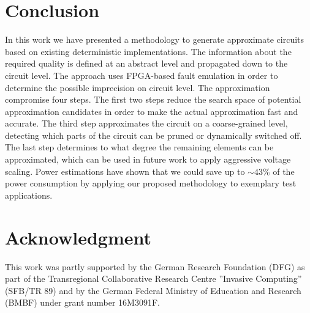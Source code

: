 \documentclass[10pt,twocolumn]{IEEEtran} %
\begin{document}
\section{\bf{Conclusion}}
\label{sec:conclusion}
In this work we have presented a methodology to generate approximate circuits based on existing deterministic implementations. The information about the required quality is defined at an abstract level and propagated down to the circuit level. The approach uses FPGA-based fault emulation in order to determine the possible imprecision on circuit level. The approximation compromise four steps. The first two steps reduce the search space of potential approximation candidates in order to make the actual approximation fast and accurate. The third step approximates the circuit on a coarse-grained level, detecting which parts of the circuit can be pruned or dynamically switched off. The last step determines to what degree the remaining elements can be approximated, which can be used in future work to apply aggressive voltage scaling. Power estimations have shown that we could save up to $\sim43\%$ of the power consumption by applying our proposed methodology to exemplary test applications.





\section*{\bf{Acknowledgment}}
This work was partly supported by the German Research Foundation (DFG) as part of the Transregional Collaborative Research Centre ”Invasive Computing” (SFB/TR 89) and by the German Federal Ministry of Education and Research (BMBF) under grant number 16M3091F.

\nocite{*}


\end{document}
